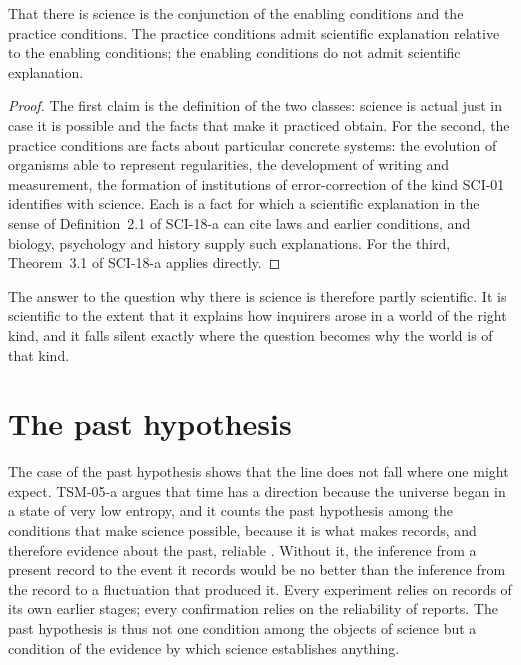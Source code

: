 \documentclass{situationist-preprint}
\begin{document}
\begin{proposition}\label{p:div}
That there is science is the conjunction of the enabling conditions and the practice conditions. The practice conditions admit scientific explanation relative to the enabling conditions; the enabling conditions do not admit scientific explanation.
\end{proposition}

\begin{proof}
The first claim is the definition of the two classes: science is actual just in case it is possible and the facts that make it practiced obtain. For the second, the practice conditions are facts about particular concrete systems: the evolution of organisms able to represent regularities, the development of writing and measurement, the formation of institutions of error-correction of the kind SCI-01 identifies with science. Each is a fact for which a scientific explanation in the sense of Definition~2.1 of SCI-18-a can cite laws and earlier conditions, and biology, psychology and history supply such explanations. For the third, Theorem~3.1 of SCI-18-a applies directly.
\end{proof}

The answer to the question why there is science is therefore partly scientific. It is scientific to the extent that it explains how inquirers arose in a world of the right kind, and it falls silent exactly where the question becomes why the world is of that kind.

\section{The past hypothesis}

The case of the past hypothesis shows that the line does not fall where one might expect. TSM-05-a argues that time has a direction because the universe began in a state of very low entropy, and it counts the past hypothesis among the conditions that make science possible, because it is what makes records, and therefore evidence about the past, reliable \citep{Albert2000}. Without it, the inference from a present record to the event it records would be no better than the inference from the record to a fluctuation that produced it. Every experiment relies on records of its own earlier stages; every confirmation relies on the reliability of reports. The past hypothesis is thus not one condition among the objects of science but a condition of the evidence by which science establishes anything.
\end{document}
